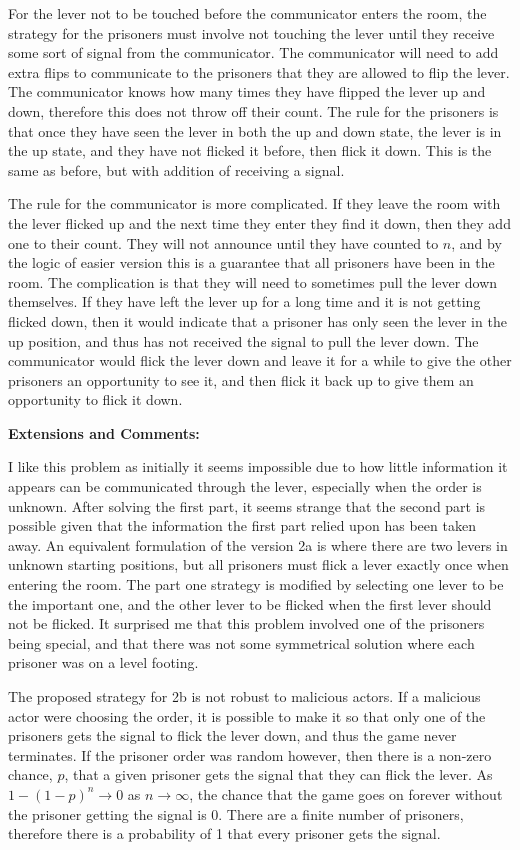 For the lever not to be touched before the communicator enters the room, the strategy for the prisoners must involve not touching the lever until they receive some sort of signal from the communicator. The communicator will need to add extra flips to communicate to the prisoners that they are allowed to flip the lever. The communicator knows how many times they have flipped the lever up and down, therefore this does not throw off their count. The rule for the prisoners is that once they have seen the lever in both the up and down state, the lever is in the up state, and they have not flicked it before, then flick it down. This is the same as before, but with addition of receiving a signal.

The rule for the communicator is more complicated. If they leave the room with the lever flicked up and the next time they enter they find it down, then they add one to their count. They will not announce until they have counted to $n$, and by the logic of easier version this is a guarantee that all prisoners have been in the room. The complication is that they will need to sometimes pull the lever down themselves. If they have left the lever up for a long time and it is not getting flicked down, then it would indicate that a prisoner has only seen the lever in the up position, and thus has not received the signal to pull the lever down. The communicator would flick the lever down and leave it for a while to give the other prisoners an opportunity to see it, and then flick it back up to give them an opportunity to flick it down.

\textbf{Extensions and Comments:}

I like this problem as initially it seems impossible due to how little information it appears can be communicated through the lever, especially when the order is unknown. After solving the first part, it seems strange that the second part is possible given that the information the first part relied upon has been taken away. An equivalent formulation of the version 2a is where there are two levers in unknown starting positions, but all prisoners must flick a lever exactly once when entering the room. The part one strategy is modified by selecting one lever to be the important one, and the other lever to be flicked when the first lever should not be flicked. It surprised me that this problem involved one of the prisoners being special, and that there was not some symmetrical solution where each prisoner was on a level footing.

The proposed strategy for 2b is not robust to malicious actors. If a malicious actor were choosing the order, it is possible to make it so that only one of the prisoners gets the signal to flick the lever down, and thus the game never terminates. If the prisoner order was random however, then there is a non-zero chance, $p$, that a given prisoner gets the signal that they can flick the lever. As $1 - (1 - p)^n \to 0$ as $n \to \infty$, the chance that the game goes on forever without the prisoner getting the signal is 0. There are a finite number of prisoners, therefore there is a probability of 1 that every prisoner gets the signal.

